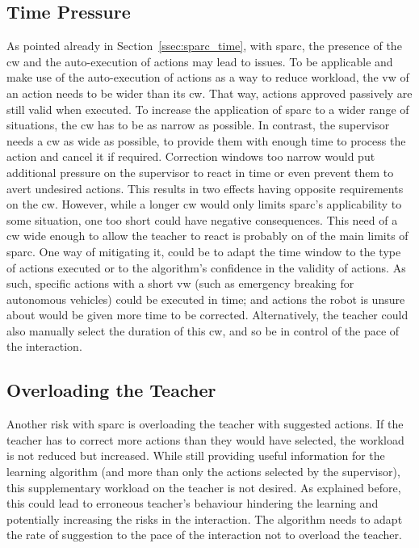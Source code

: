 \subsection{Time Pressure}
As pointed already in Section~\ref{ssec:sparc_time}, with \gls{sparc}, the presence of the \gls{cw} and the auto-execution of actions may lead to issues. To be applicable and make use of the auto-execution of actions as a way to reduce workload, the \gls{vw} of an action needs to be wider than its \gls{cw}. That way, actions approved passively are still valid when executed. To increase the application of \gls{sparc} to a wider range of situations, the \gls{cw} has to be as narrow as possible. In contrast, the supervisor needs a \gls{cw} as wide as possible, to provide them with enough time to process the action and cancel it if required. Correction windows too narrow would put additional pressure on the supervisor to react in time or even prevent them to avert undesired actions. %
This results in two effects having opposite requirements on the \gls{cw}. However, while a longer \gls{cw} would only limits \gls{sparc}'s applicability to some situation, one too short could have negative consequences. This need of a \gls{cw} wide enough to allow the teacher to react is probably on of the main limits of \gls{sparc}. One way of mitigating it, could be to adapt the time window to the type of actions executed or to the algorithm's confidence in the validity of actions. As such, specific actions with a short \gls{vw} (such as emergency breaking for autonomous vehicles) could be executed in time; and actions the robot is unsure about would be given more time to be corrected. Alternatively, the teacher could also manually select the duration of this \gls{cw}, and so be in control of the pace of the interaction.

\subsection{Overloading the Teacher}
Another risk with \gls{sparc} is overloading the teacher with suggested actions. If the teacher has to correct more actions than they would have selected, the workload is not reduced but increased. While still providing useful information for the learning algorithm (and more than only the actions selected by the supervisor), this supplementary workload on the teacher is not desired. As explained before, this could lead to erroneous teacher's behaviour hindering the learning and potentially increasing the risks in the interaction. The algorithm needs to adapt the rate of suggestion to the pace of the interaction not to overload the teacher.

